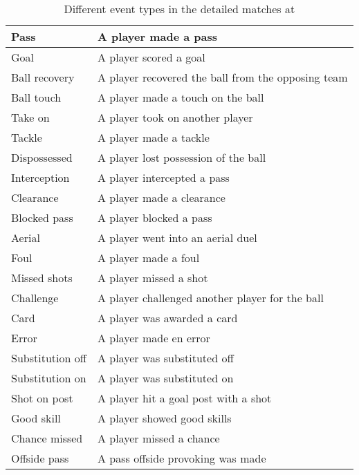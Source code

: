 \begin{table}[H]
\begin{tabulary}{\textwidth}{| L | L |}
        Pass                & A player made a pass \\\hline
        Goal                & A player scored a goal \\\hline
        Ball recovery       & A player recovered the ball from the opposing team \\\hline
        Ball touch          & A player made a touch on the ball \\\hline
        Take on             & A player took on another player \\\hline
        Tackle              & A player made a tackle \\\hline
        Dispossessed        & A player lost possession of the ball \\\hline
        Interception        & A player intercepted a pass \\\hline
        Clearance           & A player made a clearance \\\hline
        Blocked pass        & A player blocked a pass \\\hline
        Aerial              & A player went into an aerial duel \\\hline
        Foul                & A player made a foul \\\hline
        Missed shots        & A player missed a shot \\\hline
        Challenge           & A player challenged another player for the ball \\\hline
        Card                & A player was awarded a card \\\hline
        Error               & A player made en error \\\hline
        Substitution off    & A player was substituted off \\\hline
        Substitution on     & A player was substituted on \\\hline
        Shot on post        & A player hit a goal post with a shot \\\hline
        Good skill          & A player showed good skills \\\hline
        Chance missed       & A player missed a chance \\\hline
        Offside pass        & A pass offside provoking was made \\\hline
    \end{tabulary}
    \caption{Different event types in the detailed matches at \whoscored}
    \label{tab:whoscored-event-types}
\end{table}

